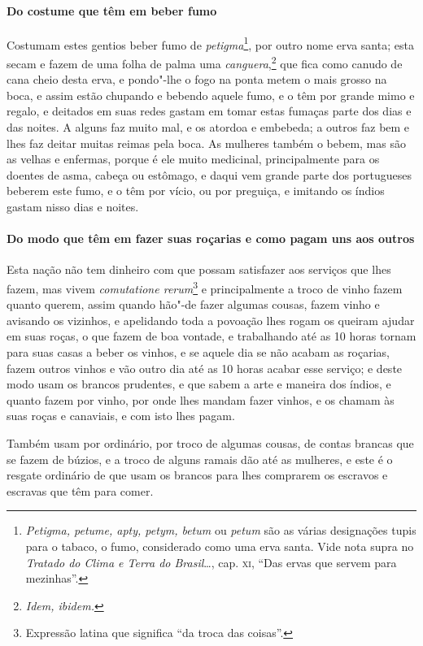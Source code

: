 \paragraph{Do costume que têm em beber fumo}

Costumam estes gentios beber fumo de \textit{petigma}\footnote{ \textit{Petigma, 
petume, apty, petym, betum} ou \textit{petum} são as várias designações tupis para o tabaco, o fumo,
considerado como uma erva santa. Vide nota supra no \textit{Tratado do
Clima e Terra do Brasil}\ldots{}, cap. \textsc{xi}, ``Das ervas que servem
para mezinhas''.}, por outro nome erva santa; esta
secam e fazem de uma folha de palma uma \textit{canguera},\footnote{ \textit{Idem, ibidem.}} 
que fica como canudo de cana cheio desta erva, e pondo"-lhe o fogo na ponta metem o mais grosso na boca, e
assim estão chupando e bebendo aquele fumo, e o têm por grande mimo e
regalo, e deitados em suas redes gastam em tomar estas fumaças parte
dos dias e das noites. A alguns faz muito mal, e os atordoa e embebeda;
a outros faz bem e lhes faz deitar muitas reimas pela boca. As mulheres
também o bebem, mas são as velhas e enfermas, porque é ele muito
medicinal, principalmente para os doentes de asma, cabeça ou estômago,
e daqui vem grande parte dos portugueses beberem este fumo, e o têm por
vício, ou por preguiça, e imitando os índios gastam nisso dias e noites.

\paragraph{Do modo que têm em fazer suas roçarias e como pagam uns aos outros}

Esta nação não tem dinheiro com que possam satisfazer aos
serviços que lhes fazem, mas vivem \textit{comutatione rerum}\footnote{ Expressão latina que significa ``da troca das coisas''.} e
principalmente a troco de vinho fazem quanto querem, assim quando
hão"-de fazer algumas cousas, fazem vinho e avisando os vizinhos, e
apelidando toda a povoação lhes rogam os queiram ajudar em suas roças,
o que fazem de boa vontade, e trabalhando até as 10 horas tornam para
suas casas a beber os vinhos, e se aquele dia se não acabam as
roçarias, fazem outros vinhos e vão outro dia até as 10 horas acabar
esse serviço; e deste modo usam os brancos prudentes, e que sabem a
arte e maneira dos índios, e quanto fazem por vinho, por onde lhes
mandam fazer vinhos, e os chamam às suas roças e canaviais, e com isto lhes pagam.

 Também usam por ordinário, por troco de algumas cousas, de contas
brancas que se fazem de búzios, e a troco de alguns ramais dão até as
mulheres, e este é o resgate ordinário de que usam os brancos para lhes
comprarem os escravos e escravas que têm para comer.


